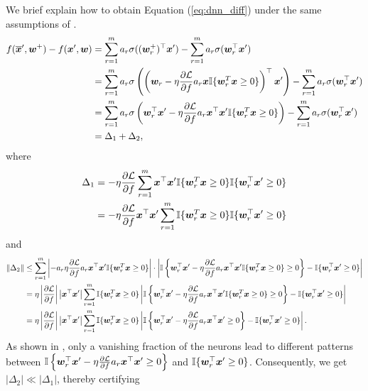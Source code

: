 We brief explain how to obtain Equation (\ref{eq:dnn_diff}) under the same assumptions of \citet{li2018learning}.
\[
\begin{aligned}
f(\overline{\bm{x}}', \bm{w}^+) - f(\bm{x}', \bm{w}) &= \sum_{r=1}^m a_r \sigma((\bm{w}_r^+)^\top \bm{x}') - \sum_{r=1}^m a_r \sigma(\bm{w}_r^\top \bm{x}')\\
&= \sum_{r=1}^m a_r \sigma\left(\left(\bm{w}_r - \eta \frac{\partial \mathcal{L}}{\partial f} a_r \bm{x} \mathbb{I}\{\bm{w}_r^T \bm{x} \ge 0\} \right)^\top \bm{x}' \right) - \sum_{r=1}^m a_r \sigma(\bm{w}_r^\top \bm{x}')\\
&= \sum_{r=1}^m a_r \sigma\left( \bm{w}_r^\top \bm{x}' - \eta \frac{\partial \mathcal{L}}{\partial f} a_r \bm{x}^\top \bm{x}' \mathbb{I}\{\bm{w}_r^T \bm{x} \ge 0\} \right) - \sum_{r=1}^m a_r \sigma(\bm{w}_r^\top \bm{x}')\\
& = \Delta_1 + \Delta_2,
\end{aligned}
\]
where
\[
\begin{aligned}
\Delta_1 &= - \eta \frac{\partial \mathcal{L}}{\partial f} \sum_{r=1}^m \bm{x}^\top \bm{x}' \mathbb{I}\{\bm{w}_r^T \bm{x} \ge 0\} \mathbb{I}\{\bm{w}_r^\top \bm{x}' \ge 0\}\\
&= - \eta \frac{\partial \mathcal{L}}{\partial f}\bm{x}^\top \bm{x}'  \sum_{r=1}^m \mathbb{I}\{\bm{w}_r^T \bm{x} \ge 0\} \mathbb{I}\{\bm{w}_r^\top \bm{x}' \ge 0\}
\end{aligned}
\]
and 
\[
\begin{aligned}
\|\Delta_2\|  &\le \sum_{r=1}^m \left| - a_r \eta \frac{\partial \mathcal{L}}{\partial f} a_r \bm{x}^\top \bm{x}' \mathbb{I}\{\bm{w}_r^T \bm{x} \ge 0\} \right| \cdot \left| \mathbb{I}\left\{ \bm{w}_r^\top \bm{x}' - \eta \frac{\partial \mathcal{L}}{\partial f} a_r \bm{x}^\top \bm{x}' \mathbb{I}\{\bm{w}_r^T \bm{x} \ge 0\} \ge 0\right\} -  \mathbb{I}\{\bm{w}_r^\top \bm{x}' \ge 0\} \right|\\
&=  \eta \left|\frac{\partial \mathcal{L}}{\partial f} \right| \left|\bm{x}^\top \bm{x}' \right|\sum_{r=1}^m \mathbb{I}\{\bm{w}_r^T \bm{x} \ge 0\} \left| \mathbb{I}\left\{ \bm{w}_r^\top \bm{x}' - \eta \frac{\partial \mathcal{L}}{\partial f} a_r \bm{x}^\top \bm{x}' \mathbb{I}\{\bm{w}_r^T \bm{x} \ge 0\} \ge 0\right\} -  \mathbb{I}\{\bm{w}_r^\top \bm{x}' \ge 0\} \right|\\
&=  \eta \left|\frac{\partial \mathcal{L}}{\partial f}\right| \left|\bm{x}^\top \bm{x}' \right|\sum_{r=1}^m \mathbb{I}\{\bm{w}_r^T \bm{x} \ge 0\} \left| \mathbb{I}\left\{ \bm{w}_r^\top \bm{x}' - \eta \frac{\partial \mathcal{L}}{\partial f} a_r \bm{x}^\top \bm{x}' \ge 0\right\} -  \mathbb{I}\{\bm{w}_r^\top \bm{x}' \ge 0\} \right|.
\end{aligned}
\]
As shown in \citet{li2018learning}, only a vanishing fraction of the neurons lead to different patterns between $\mathbb{I}\left\{ \bm{w}_r^\top \bm{x}' - \eta \frac{\partial \mathcal{L}}{\partial f} a_r \bm{x}^\top \bm{x}' \ge 0\right\}$ and $\mathbb{I}\{\bm{w}_r^\top \bm{x}' \ge 0\}$. Consequently, we get $|\Delta_2| \ll |\Delta_1|$, thereby certifying
